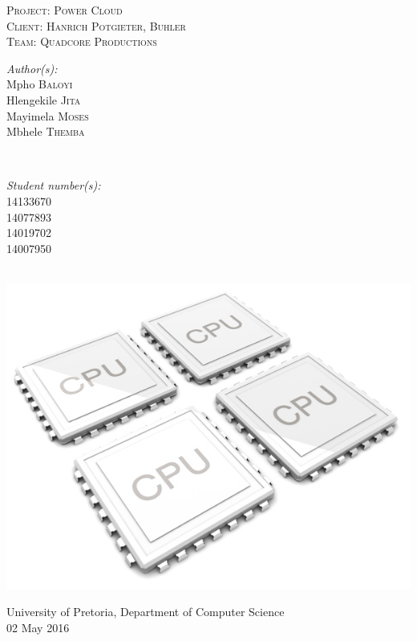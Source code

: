 \documentclass[a4paper,12pt]{article}
\begin{document}
\begin{titlepage}
\center

\textsc{\LARGE Project: Power Cloud}\\[1.5cm]
\textsc{\Large Client: Hanrich Potgieter, Buhler}\\[0.5cm]
\textsc{\large Team: Quadcore Productions}\\[0.5cm]

\begin{minipage}{0.4\textwidth}
\begin{flushleft} \large
\emph{Author(s):}\\
Mpho \textsc{Baloyi}\\
Hlengekile \textsc{Jita}\\
Mayimela \textsc{Moses}\\
Mbhele \textsc{Themba}\\
\end{flushleft}
\end{minipage}
~
\begin{minipage}{0.4\textwidth}
\begin{flushright} \large
\emph{Student number(s):} \\
14133670\\ %
14077893\\
14019702\\
14007950\\
\end{flushright}
\end{minipage}\\

\includegraphics[width=\textwidth]{2012-quad-core-phones}

{\large University of Pretoria, Department of Computer Science}\\

{\large 02 May 2016}\\[3cm]

\vfil

\end{titlepage}
\end{document}
